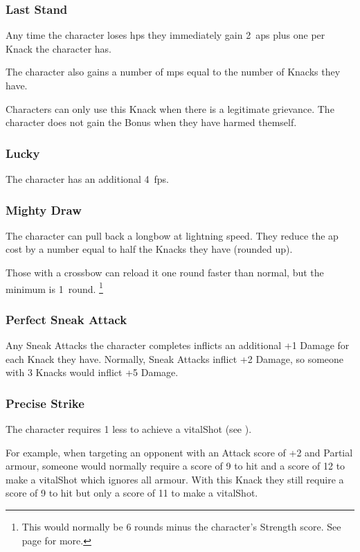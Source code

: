 \begin{multicols}{2}
\subsubsection{Last Stand}

Any time the character loses \glspl{hp} they immediately gain 2~\glspl{ap} plus one per Knack the character has.

The character also gains a number of \glspl{mp} equal to the number of Knacks they have.

Characters can only use this Knack when there is a legitimate grievance.
The character does not gain the Bonus when they have harmed themself.

\subsubsection{Lucky}

The character has an additional 4~\glspl{fp}.

\subsubsection{Mighty Draw}

The character can pull back a longbow at lightning speed.
They reduce the \gls{ap} cost by a number equal to half the Knacks they have (rounded up).

Those with a crossbow can reload it one round faster than normal, but the minimum is 1~round.%
\footnote{This would normally be 6 rounds minus the character's Strength score. See page \pageref{crossbow} for more.}

\subsubsection{Perfect Sneak Attack}

Any Sneak Attacks the character completes inflicts an additional +1 Damage for each Knack they have.
Normally, Sneak Attacks inflict +2 Damage, so someone with 3 Knacks would inflict +5 Damage.

\subsubsection{Precise Strike}\label{precisestrike}

The character requires 1 less to achieve a \gls{vitalShot} (see ).

\begin{exampletext}
  For example, when targeting an opponent with an Attack score of +2 and Partial armour, someone would normally require a score of 9 to hit and a score of 12 to make a \gls{vitalShot} which ignores all armour.
  With this Knack they still require a score of 9 to hit but only a score of 11 to make a \gls{vitalShot}.
\end{exampletext}


\end{multicols}
